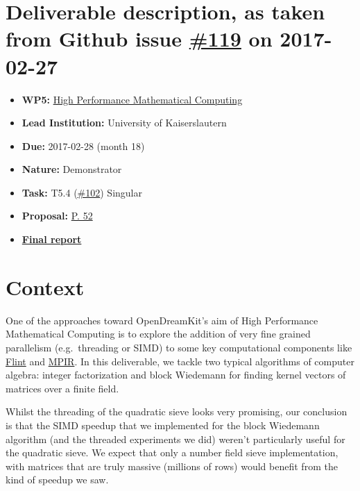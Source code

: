 \section*{\texorpdfstring{Deliverable description, as taken from Github
issue
\href{https://github.com/OpenDreamKit/OpenDreamKit/issues/119}{\#119} on
2017-02-27}{Deliverable description, as taken from Github issue \#119 on 2017-02-27}}\label{deliverable-description-as-taken-from-github-issue-119-on-2017-02-27}

\begin{itemize}
\tightlist
\item
  \textbf{WP5:}
  \href{https://github.com/OpenDreamKit/OpenDreamKit/tree/master/WP5}{High
  Performance Mathematical Computing}
\item
  \textbf{Lead Institution:} University of Kaiserslautern
\item
  \textbf{Due:} 2017-02-28 (month 18)
\item
  \textbf{Nature:} Demonstrator
\item
  \textbf{Task:} T5.4
  (\href{https://github.com/OpenDreamKit/OpenDreamKit/issues/102}{\#102})
  Singular
\item
  \textbf{Proposal:}
  \href{https://github.com/OpenDreamKit/OpenDreamKit/raw/master/Proposal/proposal-www.pdf}{P.
  52}
\item
  \textbf{\href{https://github.com/OpenDreamKit/OpenDreamKit/raw/master/WP5/D5.6/report-final.pdf}{Final
  report}}
\end{itemize}

\section{Context}\label{context}

One of the approaches toward OpenDreamKit's aim of High Performance
Mathematical Computing is to explore the addition of very fine grained
parallelism (e.g.~threading or SIMD) to some key computational
components like \href{http://flintlib.org}{Flint} and
\href{http://mpir.org/}{MPIR}. In this deliverable, we tackle two
typical algorithms of computer algebra: integer factorization and block
Wiedemann for finding kernel vectors of matrices over a finite field.

Whilst the threading of the quadratic sieve looks very promising, our
conclusion is that the SIMD speedup that we implemented for the block
Wiedemann algorithm (and the threaded experiments we did) weren't
particularly useful for the quadratic sieve. We expect that only a
number field sieve implementation, with matrices that are truly massive
(millions of rows) would benefit from the kind of speedup we saw.

